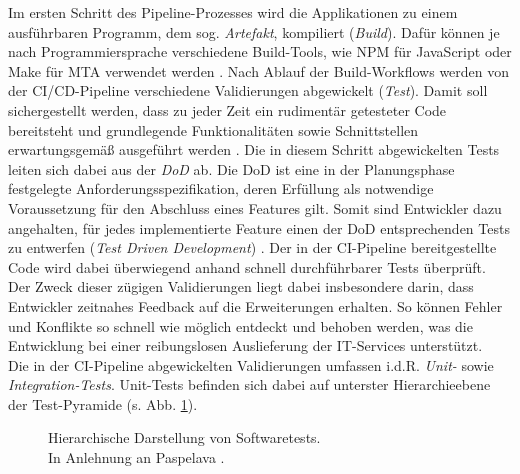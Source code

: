Im ersten Schritt des Pipeline-Prozesses wird die Applikationen zu einem ausführ\-baren Programm, dem sog. \textit{Artefakt}, kompiliert (\textit{Build}). Dafür können je nach Programmiersprache verschiedene Build-Tools, wie NPM für JavaScript oder Make für \ac{MTA} verwendet werden \cite[737]{Lange.2023}. Nach Ablauf der Build-Workflows werden von der CI/CD-Pipeline verschiedene Validierungen abgewickelt (\textit{Test}). Damit soll sichergestellt werden, dass zu jeder Zeit ein rudimentär getesteter Code bereitsteht und grundlegende Funktionalitäten sowie Schnittstellen erwartungsgemäß ausgeführt werden \cite[19]{Halstenberg.2020}. Die in diesem Schritt abgewickelten Tests leiten sich dabei aus der \textit{\ac{DoD}} ab. Die DoD ist eine in der Planungsphase festgelegte Anforderungsspezifikation, deren Erfüllung als notwendige Voraussetzung für den Abschluss eines Features gilt. Somit sind Entwickler dazu angehalten, für jedes implementierte Feature einen der DoD entsprechenden Tests zu entwerfen (\textit{Test Driven Development}) \cite{.20230419}. Der in der CI-Pipeline bereitgestellte Code wird dabei überwiegend anhand schnell durchführbarer Tests überprüft. Der Zweck dieser zügigen Validierungen liegt dabei insbesondere darin, dass Entwickler zeitnahes Feedback auf die Erweiterungen erhalten. So können Fehler und Konflikte so schnell wie möglich entdeckt und behoben werden, was die Entwicklung bei einer reibungslosen Auslieferung der IT-Services unterstützt.\\ Die in der CI-Pipeline abgewickelten Validierungen umfassen i.d.R. \textit{Unit-} sowie \textit{Integration-Tests}. Unit-Tests befinden sich dabei auf unterster Hierarchieebene der Test-Pyramide (s. Abb. \ref{fig:Tests}).
\begin{center}
	\begin{figure}[H]
		\centering
		\caption[Hierarchische Darstellung von Softwaretests]{Hierarchische Darstellung von Softwaretests.\\ \hspace{0.5cm}In Anlehnung an Paspelava \cite{Exposit.2021}.}
		\label{fig:Tests}
	\end{figure}
\end{center}
\vspace*{-15mm}

